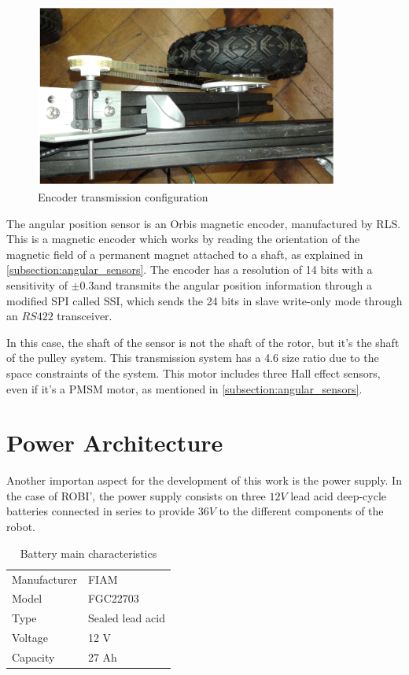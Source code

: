 \begin{figure}[htbp]
\centering
\includegraphics[width=10cm]{Images/orbis_pulley.png} 
\caption[Encoder Transmission Configuration]{Encoder transmission configuration}
\label{fig:orbis_pulley}
\end{figure}

The angular position sensor is an Orbis magnetic encoder, manufactured by RLS. This is a magnetic encoder which works by reading the orientation of the magnetic field of a permanent magnet attached to a shaft, as explained in \ref{subsection:angular_sensors}. The encoder has a resolution of 14 bits with a sensitivity of $\pm0.3$\degree and transmits the angular position information through a modified \acf{SPI} called \acf{SSI}, which sends the 24 bits in slave write-only mode through an $RS422$ transceiver. 

In this case, the shaft of the sensor is not the shaft of the rotor, but it's the shaft of the pulley system. This transmission system has a 4.6 size ratio due to the space constraints of the system. This motor includes three Hall effect sensors, even if it's a \ac{PMSM} motor, as mentioned in \ref{subsection:angular_sensors}.

\section{Power Architecture}

Another importan aspect for the development of this work is the power supply. In the case of ROBI', the power supply consists on three $12V$ lead acid deep-cycle batteries connected in series to provide $36V$ to the different components of the robot.

\begin{table}[]
\centering
\caption{Battery main characteristics}
\label{table:battery}
\begin{tabular}{@{}ll@{}}
\toprule
Manufacturer	&	FIAM				\\
Model			&	FGC22703			\\
Type			&	Sealed lead acid 	\\
Voltage			&	12 V 				\\
Capacity 		&  	27 Ah 				\\
\bottomrule
\end{tabular}
\end{table}

